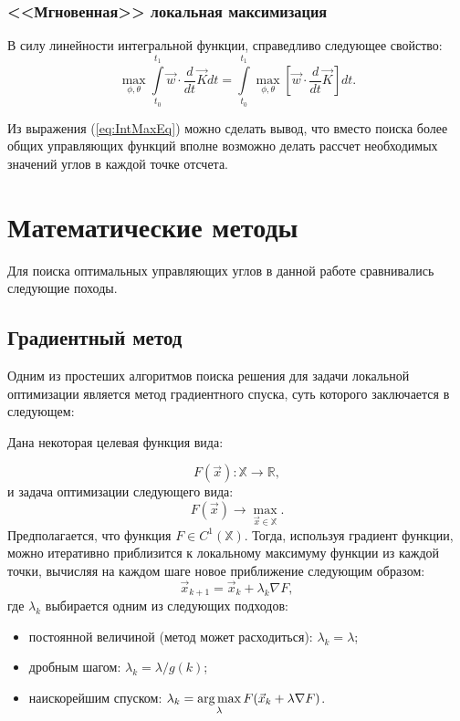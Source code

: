 \subsubsection{<<Мгновенная>> локальная максимизация}
\noindent\indent В силу линейности интегральной функции, справедливо следующее свойство:
\begin{equation} \label{eq:IntMaxEq}
    \max\limits_{\phi, \theta}\int\limits_{t_0}^{t_1} \vec{w} \cdot \frac{d}{dt}\vec{K} dt =
    \int\limits_{t_0}^{t_1} \max\limits_{\phi, \theta} \left[\vec{w} \cdot \frac{d}{dt}\vec{K}\right] dt.
\end{equation}\par
  Из выражения (\ref{eq:IntMaxEq}) можно сделать вывод, что вместо поиска более общих
управляющих функций вполне возможно делать рассчет необходимых значений углов в каждой
точке отсчета.
\section{Математические методы}
\noindent\indent Для поиска оптимальных управляющих углов в данной работе сравнивались
следующие походы.
\subsection{Градиентный метод}
\noindent\indent Одним из простеших алгоритмов поиска решения для задачи локальной
оптимизации является метод градиентного спуска, суть которого заключается в следующем:\par
  Дана некоторая целевая функция вида:\par
\begin{equation}
  F(\vec{x}) : \mathbb{X} \rightarrow \mathbb{R},
\end{equation}
и задача оптимизации следующего вида:
\begin{equation}
  F(\vec{x}) \rightarrow \max\limits_{\vec{x}\in \mathbb{X}}.
\end{equation}
Предполагается, что функция $F \in C^1(\mathbb{X})$. Тогда, используя градиент
функции, можно итеративно приблизится к локальному максимуму функции из каждой точки,
вычисляя на каждом шаге новое приближение следующим образом:
\begin{equation}
  \vec{x}_{k+1} = \vec{x}_{k} + \lambda_{k} \nabla F,
\end{equation}
где $\lambda_{k}$ выбирается одним из следующих подходов:
\begin{itemize}
  \item постоянной величиной (метод может расходиться): $\lambda_{k} = \lambda$;
  \item дробным шагом: $\lambda_{k} = \lambda / g(k)$;
  \item наискорейшим спуском: $\lambda_{k} = \operatorname*{arg\,max}\limits_{\lambda} F(\vec{x}_{k} + \lambda \nabla F)$.
\end{itemize}
